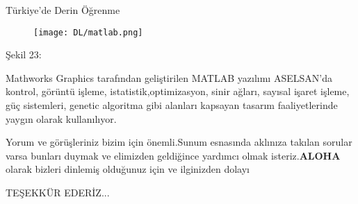 \documentclass{beamer}                                                                                          %
\begin{document}
   
    \begin{frame}{Türkiye'de Derin Öğrenme}
	     \justifying
	      \begin{figure}
                    \centering
                    \texttt{[image: DL/matlab.png]}
                \end{figure}\vspace{10}
                \begin{center}
                    \color{myred1}Şekil 23:
                \end{center}\color{black}
	     \color{myred1} \color{black}Mathworks Graphics tarafından geliştirilen MATLAB yazılımı ASELSAN’da kontrol, görüntü işleme, istatistik,optimizasyon, sinir ağları, sayısal işaret işleme, güç sistemleri, genetic algoritma gibi alanları kapsayan tasarım faaliyetlerinde yaygın olarak kullanılıyor.
    \end{frame}
    
    
    \begin{frame}
        \centering
        \huge Yorum ve görüşleriniz bizim için önemli.Sunum esnasında aklınıza takılan sorular varsa bunları duymak ve elimizden geldiğince yardımcı olmak isteriz.\textbf{\color{myred1}ALOHA\color{black}} olarak bizleri dinlemiş olduğunuz için ve ilginizden dolayı\par TEŞEKKÜR EDERİZ...
    \end{frame}
    
    
\end{document}
